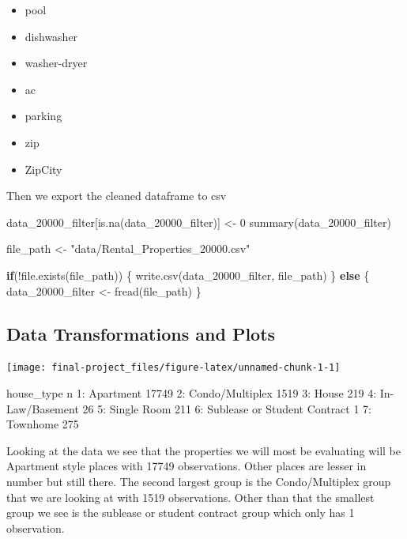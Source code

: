 \documentclass[
]{article}
\newenvironment{Shaded}{\begin{snugshade}}{\end{snugshade}}
\newcommand{\ControlFlowTok}[1]{\textcolor[rgb]{0.13,0.29,0.53}{\textbf{#1}}}
\newcommand{\DecValTok}[1]{\textcolor[rgb]{0.00,0.00,0.81}{#1}}
\newcommand{\FunctionTok}[1]{\textcolor[rgb]{0.00,0.00,0.00}{#1}}
\newcommand{\NormalTok}[1]{#1}
\newcommand{\OtherTok}[1]{\textcolor[rgb]{0.56,0.35,0.01}{#1}}
\newcommand{\SpecialCharTok}[1]{\textcolor[rgb]{0.00,0.00,0.00}{#1}}
\newcommand{\StringTok}[1]{\textcolor[rgb]{0.31,0.60,0.02}{#1}}
\providecommand{\tightlist}{%
  \setlength{\itemsep}{0pt}\setlength{\parskip}{0pt}}
\begin{document}
\begin{itemize}
\tightlist
\item
  pool
\item
  dishwasher
\item
  washer-dryer
\item
  ac
\item
  parking
\item
  zip
\item
  ZipCity
\end{itemize}

Then we export the cleaned dataframe to csv

\begin{Shaded}
\begin{Highlighting}[]
\NormalTok{data\_20000\_filter[}\FunctionTok{is.na}\NormalTok{(data\_20000\_filter)] }\OtherTok{\textless{}{-}} \DecValTok{0}
\FunctionTok{summary}\NormalTok{(data\_20000\_filter)}

\NormalTok{file\_path }\OtherTok{\textless{}{-}} \StringTok{"data/Rental\_Properties\_20000.csv"}

\ControlFlowTok{if}\NormalTok{(}\SpecialCharTok{!}\FunctionTok{file.exists}\NormalTok{(file\_path)) \{}
  \FunctionTok{write.csv}\NormalTok{(data\_20000\_filter, file\_path)}
\NormalTok{\} }\ControlFlowTok{else}\NormalTok{ \{}
\NormalTok{  data\_20000\_filter }\OtherTok{\textless{}{-}} \FunctionTok{fread}\NormalTok{(file\_path)}
\NormalTok{\}}
\end{Highlighting}
\end{Shaded}

\hypertarget{data-transformations-and-plots}{%
\subsection{Data Transformations and
Plots}\label{data-transformations-and-plots}}

\begin{center}\texttt{[image: final-project\_files/figure-latex/unnamed-chunk-1-1]} \end{center}

house\_type n 1: Apartment 17749 2: Condo/Multiplex 1519 3: House 219 4:
In-Law/Basement 26 5: Single Room 211 6: Sublease or Student Contract 1
7: Townhome 275

Looking at the data we see that the properties we will most be
evaluating will be Apartment style places with 17749 observations. Other
places are lesser in number but still there. The second largest group is
the Condo/Multiplex group that we are looking at with 1519 observations.
Other than that the smallest group we see is the sublease or student
contract group which only has 1 observation.
\end{document}
